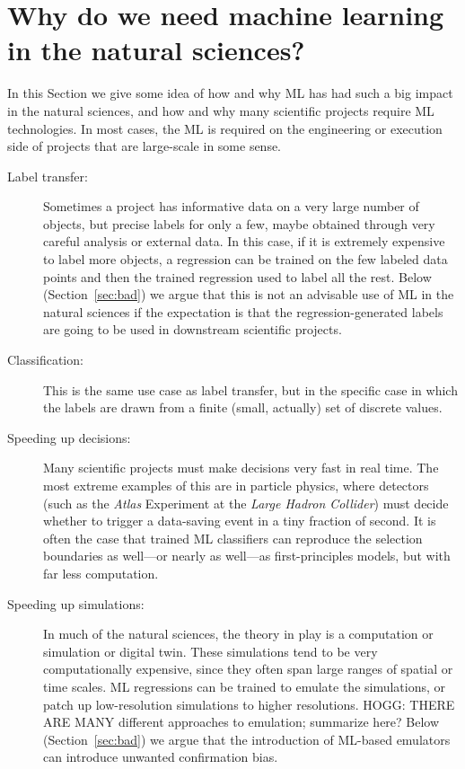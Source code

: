 \documentclass[10pt]{article}
\newcommand{\sectionname}{Section}
\begin{document}
\section{Why do we need machine learning in the natural sciences?}\label{sec:why}
In this \sectionname{} we give some idea of how and why ML has had such a big impact in the natural sciences, and how and why many scientific projects require ML technologies.
In most cases, the ML is required on the engineering or execution side of projects that are large-scale in some sense.
\begin{description}
  \item[Label transfer:] Sometimes a project has informative data on a very large number of objects, but precise labels for only a few, maybe obtained through very careful analysis or external data.
  In this case, if it is extremely expensive to label more objects, a regression can be trained on the few labeled data points and then the trained regression used to label all the rest.
  Below (\sectionname~\ref{sec:bad}) we argue that this is not an advisable use of ML in the natural sciences if the expectation is that the regression-generated labels are going to be used in downstream scientific projects.
  \item[Classification:] This is the same use case as label transfer, but in the specific case in which the labels are drawn from a finite (small, actually) set of discrete values.
  \item[Speeding up decisions:] Many scientific projects must make decisions very fast in real time.
  The most extreme examples of this are in particle physics, where detectors (such as the \textsl{Atlas} Experiment \cite{atlas} at the \textsl{Large Hadron Collider}) must decide whether to trigger a data-saving event in a tiny fraction of second.
  It is often the case that trained ML classifiers can reproduce the selection boundaries as well---or nearly as well---as first-principles models, but with far less computation.
  \item[Speeding up simulations:] In much of the natural sciences, the theory in play is a computation or simulation or digital twin.
  These simulations tend to be very computationally expensive, since they often span large ranges of spatial or time scales.
  ML regressions can be trained to emulate the simulations, or patch up low-resolution simulations to higher resolutions.
  HOGG: THERE ARE MANY different approaches to emulation; summarize here?
  Below (\sectionname~\ref{sec:bad}) we argue that the introduction of ML-based emulators can introduce unwanted confirmation bias.

\end{description}
\end{document}
